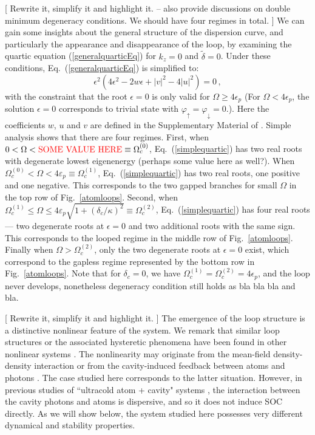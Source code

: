 \documentclass[atoms,article,submit,moreauthors,pdftex,12pt,a4paper]{mdpi}
\begin{document}
[{\color{red} Rewrite it, simplify it and highlight it. -- also provide discussions on double minimum degeneracy conditions. We should have four regimes in total. }]  We can gain some insights about the general structure of the dispersion curve, and particularly the appearance and disappearance of the loop, by examining the quartic equation (\ref{generalquarticEq}) for $k_z=0$ and $\tilde{\delta}=0$. Under these conditions, Eq.~(\ref{generalquarticEq}) is simplified to:
\begin{equation}
\epsilon^2(4\epsilon^2-2w\epsilon+|v|^2-4|u|^2)=0\,,
\label{simplequartic}
\end{equation}
with the constraint that the root $\epsilon=0$ is only valid for $\Omega \ge 4\epsilon_p$ (For $\Omega<4\epsilon_p$, the solution $\epsilon=0$ corresponds to trivial state with $\varphi_\uparrow=\varphi_\downarrow=0$.).
Here the coefficients $w$, $u$ and $v$ are defined in the Supplementary Material of \cite{cavitySOC}. Simple analysis shows that there are four regimes. First, when $0<\Omega< \text{\color{red} SOME VALUE HERE} \equiv \Omega_c^{(0)}$, Eq.~(\ref{simplequartic}) has two real roots with degenerate lowest eigenenergy {\color{red} (perhaps some value here as well?)}. When $\Omega_c^{(0)} < \Omega <4\varepsilon_p\equiv\Omega_c^{(1)}$, Eq.~(\ref{simplequartic}) has two real roots, one positive and one negative. This corresponds to the two gapped branches for small $\Omega$ in the top row of Fig.~\ref{atomloops}. Second, when $\Omega_c^{(1)} \leq \Omega \leq  4\varepsilon_p \sqrt{1+(\delta_c/\kappa)^2}\equiv\Omega_c^{(2)}$, Eq.~(\ref{simplequartic}) has four real roots --- two degenerate roots at $\epsilon=0$ and two additional roots with the same sign. This corresponds to the looped regime in the middle row of Fig.~\ref{atomloops}. Finally when $\Omega > \Omega_c^{(2)}$, only the two degenerate roots at $\epsilon=0$ exist, which correspond to the gapless regime represented by the bottom row in Fig.~\ref{atomloops}. Note that for $\delta_c=0$, we have $\Omega_c^{(1)}=\Omega_c^{(2)}=4\epsilon_p$, and the loop never develops, nonetheless degeneracy condition still holds as {\color{red} bla bla bla and bla}. 

[{\color{red} Rewrite it, simplify it and highlight it. }] The emergence of the loop structure is a distinctive nonlinear feature of the system. We remark that similar loop structures or the associated hysteretic phenomena have been found in other nonlinear systems \cite{sup}. The nonlinearity may originate from the mean-field density-density interaction \cite{loopPapers} or from the cavity-induced feedback between atoms and photons \cite{loop1}. The case studied here corresponds to the latter situation. However, in previous studies of ``ultracold atom + cavity" systems \cite{loop1}, the interaction between the cavity photons and atoms is dispersive, and so it does not induce SOC directly. As we will show below, the system studied here possesses very different dynamical and stability properties.   
\end{document}
